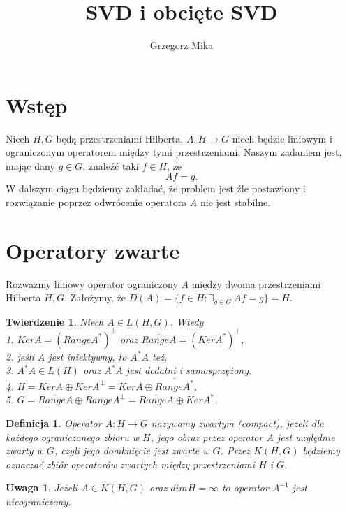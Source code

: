 \documentclass[10pt]{mwart}
\title{SVD i obcięte SVD}
\author{Grzegorz Mika}
\newtheorem{tw}{Twierdzenie}
\newtheorem{df}{Definicja}
\newtheorem{uw}{Uwaga}
\begin{document}
\maketitle
\section{Wstęp}
Niech $H,G$ będą przestrzeniami Hilberta, $A\colon H \to G$ niech będzie liniowym i ograniczonym operatorem między tymi przestrzeniami. Naszym zadaniem jest, mając dany $g\in G$, znaleźć taki $f\in H$, że
\begin{displaymath}
Af=g.
\end{displaymath}
W dalszym ciągu będziemy zakładać, że problem jest źle postawiony i rozwiązanie poprzez odwrócenie operatora $A$ nie jest stabilne.

\section{Operatory zwarte}
Rozważmy liniowy operator ograniczony $A$ między dwoma przestrzeniami Hilberta $H,G$. Założymy, że $D(A)=\{f\in H\colon \exists_{g\in G}\ Af=g\}=H$.

\begin{tw}
Niech $A\in L(H,G)$. Wtedy\\
1. $KerA=(RangeA^*)^{\perp}$ oraz $\overline{RangeA}=(KerA^*)^{\perp}$,\\
2. jeśli $A$ jest iniektywny, to $A^*A$ też,\\
3. $A^*A\in L(H)$ oraz $A^*A$ jest dodatni i samosprzężony.\\
4. $H=KerA \oplus KerA^{\perp}=KerA\oplus \overline{RangeA^*}$,\\
5. $G=\overline{RangeA}\oplus RangeA^{\perp}=\overline{RangeA}\oplus KerA^*$.
\end{tw}


\begin{df}
Operator $A\colon H \to G$ nazywamy zwartym (compact), jeżeli dla każdego ograniczonego zbioru w $H$, jego obraz przez operator $A$ jest względnie zwarty w $G$, czyli jego domknięcie jest zwarte w $G$. Przez $K(H,G)$ będziemy oznaczać zbiór operatorów zwartych między przestrzeniami $H$ i $G$.
\end{df}
\begin{uw}
Jeżeli $A\in K(H,G)$ oraz $dimH=\infty$ to operator $A^{-1}$ jest nieograniczony.
\end{uw}
\end{document}
